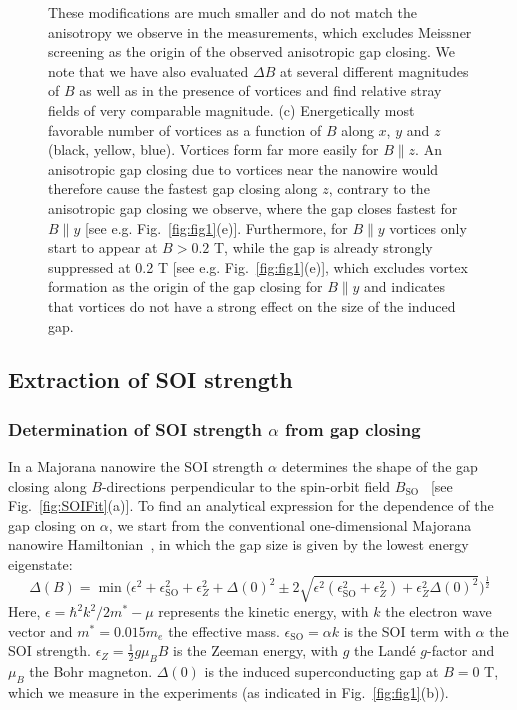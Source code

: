 \begin{figure}
\begin{center}
{These modifications are much smaller and do not match the anisotropy we observe in the measurements, which excludes Meissner screening as the origin of the observed anisotropic gap closing.
We note that we have also evaluated $\Delta B$ at several different magnitudes of $B$ as well as in the presence of vortices and find relative stray fields of very comparable magnitude.
(c) Energetically most favorable number of vortices as a function of $B$ along $x$, $y$ and $z$ (black, yellow, blue).
Vortices form far more easily for $B \parallel z$.
An anisotropic gap closing due to vortices near the nanowire would therefore cause the fastest gap closing along $z$, contrary to the anisotropic gap closing we observe, where the gap closes fastest for $B \parallel  y$ [see e.g.
Fig.~\ref{fig:fig1}(e)].
Furthermore, for $B \parallel y$ vortices only start to appear at $B > 0.2$ T, while the gap is already strongly suppressed at 0.2 T [see e.g.
Fig.~\ref{fig:fig1}(e)], which excludes vortex formation as the origin of the gap closing for $B \parallel y$ and indicates that vortices do not have a strong effect on the size of the induced gap.
}
\end{center}
\end{figure}

\subsection{Extraction of SOI strength}\label{sec:SOI_extraction}
\subsubsection{Determination of SOI strength $\alpha$ from gap closing}
In a Majorana nanowire the SOI strength $\alpha$ determines the shape of the gap closing along $B$-directions perpendicular to the spin-orbit field $B_{\mathrm{SO}}$~\cite{Heck2017,Pan2019} [see Fig.~\ref{fig:SOIFit}(a)].
To find an analytical expression for the dependence of the gap closing on $\alpha$, we start from the conventional one-dimensional Majorana nanowire Hamiltonian~\cite{Lutchyn2010,Oreg2010}, in which the gap size is given by the lowest energy eigenstate:
\begin{equation}\label{eq:S1}
\Delta(B) = \min \bigg( \epsilon^2 + \epsilon_{\mathrm{SO}}^2 + \epsilon_{Z}^2 + \Delta(0)^2 \pm 2 \sqrt{\epsilon^2 ( \epsilon_{\mathrm{SO}}^2+\epsilon_{Z}^2 ) + \epsilon_{Z}^2\Delta(0)^2} \bigg)^\frac{1}{2}
\end{equation}
Here, $\epsilon=\hbar^2k^2/2m^*-\mu$ represents the kinetic energy, with $k$ the electron wave vector and $m^*=0.015 m_e$ the effective mass.
$\epsilon_{\mathrm{SO}}=\alpha k$ is the SOI term with $\alpha$ the SOI strength.
$\epsilon_Z = \frac{1}{2}g\mu_BB$ is the Zeeman energy, with $g$ the Land\'e $g$-factor and $\mu_B$ the Bohr magneton.
$\Delta(0)$ is the induced superconducting gap at $B = 0$ T, which we measure in the experiments (as indicated in Fig.~\ref{fig:fig1}(b)).

